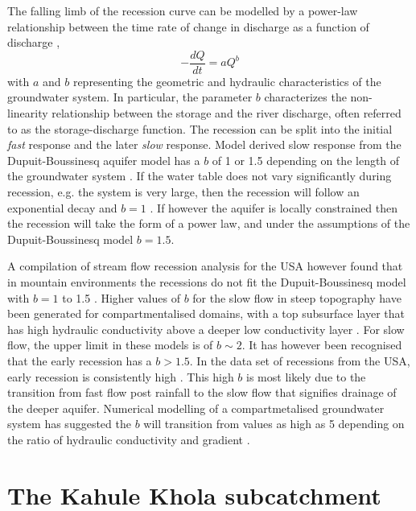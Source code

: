 \documentclass[hess, manuscript]{copernicus}
\begin{document}
The falling limb of the recession curve can be modelled by a power-law relationship between the time rate of change in discharge as a function of discharge \citep[e.g.][]{brutsaert-1977,kirchner-2009},
\begin{equation}
-\frac{dQ}{dt} = aQ^{b}
\label{eq:recession}
\end{equation}
with $a$ and $b$ representing the geometric and hydraulic characteristics of the groundwater system. In particular, the parameter $b$ characterizes the non-linearity relationship between the storage and the river discharge, often referred to as the storage-discharge function. The recession can be split into the initial \emph{fast} response and the later \emph{slow} response. Model derived slow response from the Dupuit-Boussinesq aquifer model has a $b$ of 1 or 1.5 depending on the length of the groundwater system \citep{brutsaert-1977}. If the water table does not vary significantly during recession, e.g. the system is very large, then the recession will follow an exponential decay and $b=1$ \citep{brutsaert-1977}. If however the aquifer is locally constrained then the recession will take the form of a power law, and under the assumptions of the Dupuit-Boussinesq model $b=1.5$.

A compilation of stream flow recession analysis for the USA however found that in mountain environments the recessions do not fit the Dupuit-Boussinesq model with $b=1$ to 1.5 \citep{tashie-etal-2020}. Higher values of $b$ for the slow flow in steep topography have been generated for compartmentalised domains, with a top subsurface layer that has high hydraulic conductivity above a deeper low conductivity layer \citep{rupp-2006,roques-etal-2022}. For slow flow, the upper limit in these models is of $b\sim2$. It has however been recognised that the early recession has a $b>1.5$. In the data set of recessions from the USA, early recession is consistently high \citep{tashie-etal-2020}. This high $b$ is most likely due to the transition from fast flow post rainfall to the slow flow that signifies drainage of the deeper aquifer. Numerical modelling of a compartmetalised groundwater system has suggested the $b$ will transition from values as high as 5 depending on the ratio of hydraulic conductivity and gradient \citep{roques-etal-2022}.

\section{The Kahule Khola subcatchment}
\end{document}
